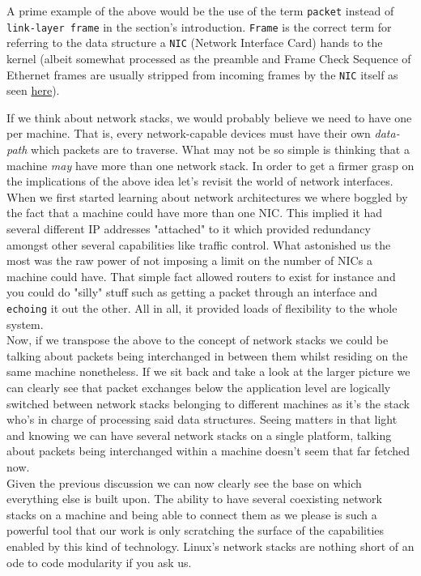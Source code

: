             A prime example of the above would be the use of the term \texttt{packet} instead of \texttt{link-layer frame} in the section's introduction. \texttt{Frame} is the correct term for referring to the data structure a \texttt{NIC} (Network Interface Card) hands to the kernel (albeit somewhat processed as the preamble and Frame Check Sequence of Ethernet frames are usually stripped from incoming frames by the \texttt{NIC} itself as seen \href{https://gitlab.com/wireshark/wireshark/-/wikis/Ethernet}{here}).

        If we think about network stacks, we would probably believe we need to have one per machine. That is, every network-capable devices must have their own \textit{data-path} which packets are to traverse. What may not be so simple is thinking that a machine \textit{may} have more than one network stack. In order to get a firmer grasp on the implications of the above idea let's revisit the world of network interfaces.\\

        When we first started learning about network architectures we where boggled by the fact that a machine could have more than one NIC. This implied it had several different IP addresses "attached" to it which provided redundancy amongst other several capabilities like traffic control. What astonished us the most was the raw power of not imposing a limit on the number of NICs a machine could have. That simple fact allowed routers to exist for instance and you could do "silly" stuff such as getting a packet through an interface and \texttt{echoing} it out the other. All in all, it provided loads of flexibility to the whole system.\\

        Now, if we transpose the above to the concept of network stacks we could be talking about packets being interchanged in between them whilst residing on the same machine nonetheless. If we sit back and take a look at the larger picture we can clearly see that packet exchanges below the application level are logically switched between network stacks belonging to different machines as it's the stack who's in charge of processing said data structures. Seeing matters in that light and knowing we can have several network stacks on a single platform, talking about packets being interchanged within a machine doesn't seem that far fetched now.\\

        Given the previous discussion we can now clearly see the base on which everything else is built upon. The ability to have several coexisting network stacks on a machine and being able to connect them as we please is such a powerful tool that our work is only scratching the surface of the capabilities enabled by this kind of technology. Linux's network stacks are nothing short of an ode to code modularity if you ask us.\\

